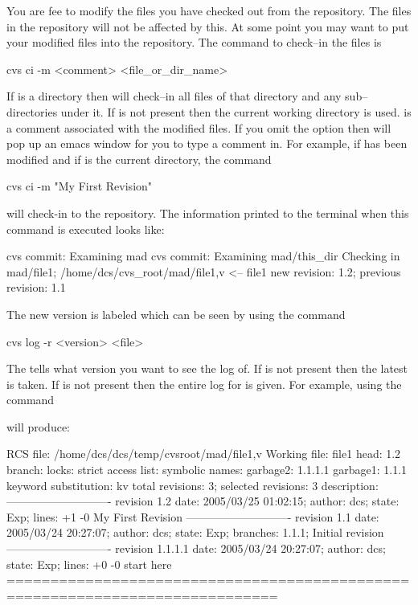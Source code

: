 You are fee to modify the files you have checked out from the
repository. The files in the repository will not be affected by this.
At some point you may want to put your modified files into the
repository. The command to check--in the files is
\begin{example}
  cvs ci -m <comment> <file_or_dir_name>
\end{example}
If  is a directory then \cvs will check--in all
files of that directory and any sub--directories under it. If
 is not present then the current working
directory is used.  is a comment associated with the
modified files. If you omit the  option then \cvs
will pop up an emacs window for you to type a comment in.
For example, if  has been modified
and if  is the current directory, the command
\begin{example}
  cvs ci -m "My First Revision"
\end{example}
will check-in  to the repository. The information printed to
the terminal when this command is executed looks like:
\begin{example}
  cvs commit: Examining mad
  cvs commit: Examining mad/this_dir
  Checking in mad/file1;
  /home/dcs/cvs_root/mad/file1,v  <--  file1
  new revision: 1.2; previous revision: 1.1
\end{example}
The new version is labeled  which can be seen by using the command
\begin{example}
  cvs log -r <version> <file>
\end{example}
The  tells \cvs what version you want to see the log
of. If  is not present then the latest is taken. If
 is not present then the entire log for  is
given. For example, using the command 
\begin{example}
  cvs log file1} 
\end{example}
will produce:
\begin{example}
  RCS file: /home/dcs/dcs/temp/cvsroot/mad/file1,v
  Working file: file1
  head: 1.2
  branch:
  locks: strict
  access list:
  symbolic names:
          garbage2: 1.1.1.1
          garbage1: 1.1.1
  keyword substitution: kv
  total revisions: 3;     selected revisions: 3
  description:
  ----------------------------
  revision 1.2
  date: 2005/03/25 01:02:15;  author: dcs;  state: Exp;  lines: +1 -0
  My First Revision
  ----------------------------
  revision 1.1
  date: 2005/03/24 20:27:07;  author: dcs;  state: Exp;
  branches:  1.1.1;
  Initial revision
  ----------------------------
  revision 1.1.1.1
  date: 2005/03/24 20:27:07;  author: dcs;  state: Exp;  lines: +0 -0
  start here
  =============================================================================
\end{example}
